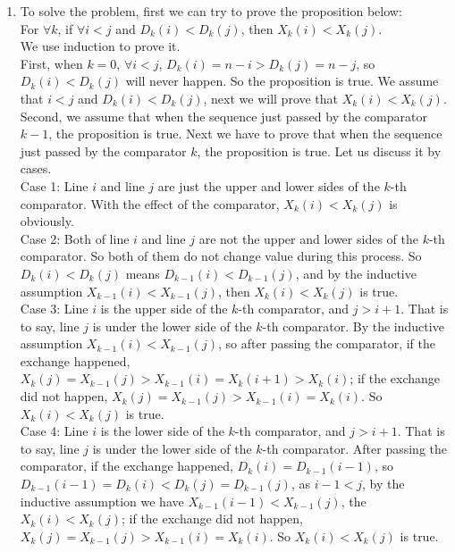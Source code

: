 \documentclass[12pt,a4paper]{article}
\makeatletter
\newtheorem*{solution}{Solution}
\theoremstyle{definition}
\renewenvironment{solution}[1][Solution] {\par\pushQED{\qed}\normalfont\topsep6\p@\@plus6\p@\relax\trivlist\item[\hskip\labelsep\bfseries#1\@addpunct{.}]\ignorespaces}{\popQED\endtrivlist\@endpefalse} \makeatother
\makeatother
\begin{document}
\begin{enumerate}
\begin{solution}
\begin{enumerate}
To solve the problem, first we can try to prove the proposition below:\\

For $\forall k$, if $\forall i<j$ and $D_k(i)<D_k(j)$, then $X_k(i)<X_k(j)$.\\

We use induction to prove it.\\

First, when $k=0$, $\forall i<j$, $D_k(i) = n -i > D_k(j) = n-j$, so $D_k(i)<D_k(j)$ will never happen. So the proposition is true. We assume that $i<j$ and $D_k(i)<D_k(j)$, next we will prove that $X_k(i)<X_k(j)$.\\

Second, we assume that when the sequence just passed by the comparator $k-1$, the proposition is true. Next we have to prove that when the sequence just passed by the comparator $k$, the proposition is true. Let us discuss it by cases.\\

Case 1: Line $i$ and line $j$ are just the upper and lower sides of the $k$-th comparator. With the effect of the comparator, $X_k(i)<X_k(j)$ is obviously.\\

Case 2: Both of line $i$ and line $j$ are not the upper and lower sides of the $k$-th comparator. So both of
them do not change value during this process. So $D_k(i)<D_k(j)$ means $D_{k-1}(i)<D_{k-1}(j)$, and by the inductive assumption $X_{k-1}(i)<X_{k-1}(j)$, then $X_{k}(i)<X_{k}(j)$ is true.\\

Case 3: Line $i$ is the upper side of the $k$-th comparator, and $j>i+1$. That is to say, line $j$ is under the lower side of the $k$-th comparator. By the inductive assumption $X_{k-1}(i)<X_{k-1}(j)$, so after passing the comparator, if the exchange happened, $X_k(j) = X_{k-1}(j) > X_{k-1}(i) = X_k(i+1) > X_k(i)$; if the exchange did not happen, $X_k(j) = X_{k-1}(j) > X_{k-1}(i) = X_k(i)$. So $X_{k}(i)<X_{k}(j)$ is true.\\

Case 4: Line $i$ is the lower side of the $k$-th comparator, and $j>i+1$. That is to say, line $j$ is under the lower side of the $k$-th comparator. After passing the comparator, if the exchange happened, $D_k(i) = D_{k-1}(i-1)$, so $D_{k-1}(i-1) = D_k(i) < D_k(j) = D_{k-1}(j)$, as $i-1 <j$, by the inductive assumption we have $X_{k-1}(i-1) < X_{k-1}(j)$, the $X_{k}(i)<X_{k}(j)$; if the exchange did not happen, $X_k(j) = X_{k-1}(j) > X_{k-1}(i) = X_k(i)$. So $X_{k}(i)<X_{k}(j)$ is true.\\


\end{enumerate}
\end{solution}
\end{enumerate}
\end{document}
